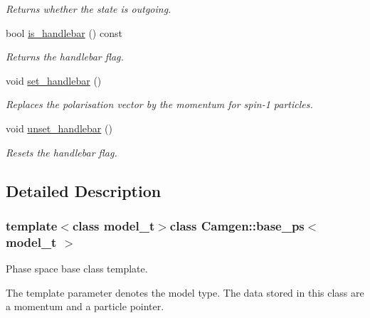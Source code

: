 \begin{DoxyCompactItemize}
\begin{DoxyCompactList}\small\item\em Returns whether the state is outgoing. \end{DoxyCompactList}\item 
\hypertarget{a00026_a3d66f467bc2edea81bfc204e547dce74}{bool \hyperlink{a00026_a3d66f467bc2edea81bfc204e547dce74}{is\-\_\-handlebar} () const }\label{a00026_a3d66f467bc2edea81bfc204e547dce74}

\begin{DoxyCompactList}\small\item\em Returns the handlebar flag. \end{DoxyCompactList}\item 
void \hyperlink{a00026_a382906c0a7eced326176cdf9386ce863}{set\-\_\-handlebar} ()
\begin{DoxyCompactList}\small\item\em Replaces the polarisation vector by the momentum for spin-\/1 particles. \end{DoxyCompactList}\item 
\hypertarget{a00026_acbcf2413e5415087ac2e3f67c82ee3bf}{void \hyperlink{a00026_acbcf2413e5415087ac2e3f67c82ee3bf}{unset\-\_\-handlebar} ()}\label{a00026_acbcf2413e5415087ac2e3f67c82ee3bf}

\begin{DoxyCompactList}\small\item\em Resets the handlebar flag. \end{DoxyCompactList}\end{DoxyCompactItemize}


\subsection{Detailed Description}
\subsubsection*{template$<$class model\-\_\-t$>$class Camgen\-::base\-\_\-ps$<$ model\-\_\-t $>$}

Phase space base class template. 

The template parameter denotes the model type. The data stored in this class are a momentum and a particle pointer. 

